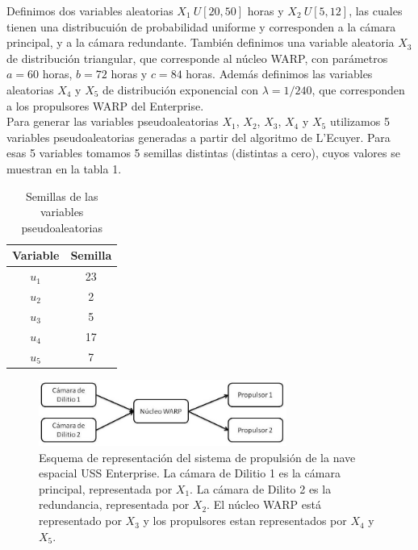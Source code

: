 \documentclass[10pt,journal,compsoc]{IEEEtran}
\begin{document}
\indent Definimos dos variables aleatorias  $X_1~U[20,50]$ horas y $X_2~U[5, 12]$, las cuales tienen una distribucui\'on de probabilidad uniforme y corresponden a la c\'amara principal, y a la c\'amara redundante. Tambi\'en definimos una variable aleatoria $X_3$ de distribuci\'on 
triangular, que corresponde al n\'ucleo WARP, con par\'ametros $a = 60$ horas, $b = 72$ horas y $c = 84$ horas. Adem\'as
definimos las variables aleatorias $X_4$ y $X_5$ de distribuci\'on exponencial con $\lambda=1/240$, que corresponden a los propulsores WARP del Enterprise.\\
\indent Para generar las variables pseudoaleatorias $X_1$, $X_2$, $X_3$, $X_4$ y $X_5$ utilizamos 5 variables pseudoaleatorias generadas
a partir del algoritmo de L'Ecuyer.  Para esas 5 variables tomamos 5 semillas distintas (distintas a cero), cuyos valores se muestran en la tabla 1.

\begin{table}[!t]
\renewcommand{\arraystretch}{1.3}
\caption{Semillas de las variables pseudoaleatorias}
\centering
\begin{tabular}{c c}
\hline
\hline
Variable  & Semilla\\
\hline
$u_1$ &  23\\
$u_2$ & 2 \\
$u_3$ & 5 \\
$u_4$ & 17  \\
$u_5$ & 7 \\
\hline
\hline
\end{tabular}
\label{tab:sim}
\end{table}






\begin{figure}[t]
\label{fig:3d}
\begin{center}
\centering
\includegraphics[width=3.2in]{propulsor.jpg}
\caption{Esquema de representaci\'on del sistema de propulsi\'on de la nave espacial USS Enterprise.  La c\'amara de Dilitio 1 es la c\'amara principal, representada por $X_1$. La c\'amara de Dilito 2 es la redundancia, representada por $X_2$. El n\'ucleo WARP est\'a representado
 por $X_3$ y los propulsores estan representados por $X_4$ y $X_5$.}
\end{center}
\end{figure}
\end{document}

